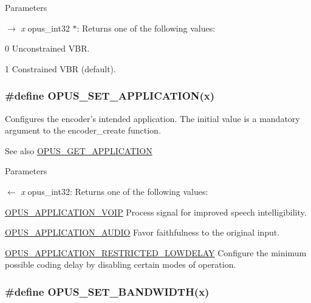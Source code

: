 \begin{DoxyParams}{Parameters}
\item[\mbox{$\rightarrow$} {\em x}]{\ttfamily opus\_\-int32 $\ast$}: Returns one of the following values: 
\begin{DoxyDescription}
\item[0]Unconstrained VBR. 
\item[1]Constrained VBR (default). 
\end{DoxyDescription}\end{DoxyParams}
\hypertarget{group__opus__encoderctls_ga18fa17dae52ff8f3eaea314204bf1a36}{
\subsubsection[{OPUS\_\-SET\_\-APPLICATION}]{\setlength{\rightskip}{0pt plus 5cm}\#define OPUS\_\-SET\_\-APPLICATION(x)}}
\label{group__opus__encoderctls_ga18fa17dae52ff8f3eaea314204bf1a36}


Configures the encoder's intended application. The initial value is a mandatory argument to the encoder\_\-create function. \begin{DoxySeeAlso}{See also}
\hyperlink{group__opus__encoderctls_ga062ebbc209caf6832fe4a309a459fd4c}{OPUS\_\-GET\_\-APPLICATION} 
\end{DoxySeeAlso}

\begin{DoxyParams}{Parameters}
\item[\mbox{$\leftarrow$} {\em x}]{\ttfamily opus\_\-int32}: Returns one of the following values: 
\begin{DoxyDescription}
\item[\hyperlink{group__opus__ctlvalues_ga07884aa018303a419d1f7acb2f3fa669}{OPUS\_\-APPLICATION\_\-VOIP} ]Process signal for improved speech intelligibility. 
\item[\hyperlink{group__opus__ctlvalues_ga5909f7cb35c04f1110026c6889edd345}{OPUS\_\-APPLICATION\_\-AUDIO} ]Favor faithfulness to the original input. 
\item[\hyperlink{group__opus__ctlvalues_ga592232fb39db60c1369989c5c5d19a07}{OPUS\_\-APPLICATION\_\-RESTRICTED\_\-LOWDELAY} ]Configure the minimum possible coding delay by disabling certain modes of operation. 
\end{DoxyDescription}\end{DoxyParams}
\hypertarget{group__opus__encoderctls_ga0178dabe5526d5b0667d81489cc93791}{
\subsubsection[{OPUS\_\-SET\_\-BANDWIDTH}]{\setlength{\rightskip}{0pt plus 5cm}\#define OPUS\_\-SET\_\-BANDWIDTH(x)}}
\label{group__opus__encoderctls_ga0178dabe5526d5b0667d81489cc93791}


